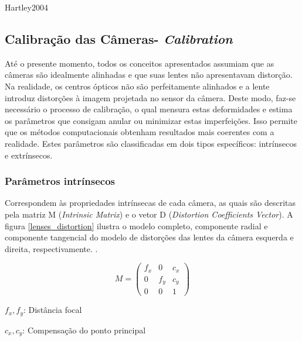 Hartley2004


\subsection{Calibração das Câmeras- \textit{Calibration}}

Até o presente momento, todos os conceitos apresentados assumiam que as câmeras são idealmente alinhadas e que suas lentes não apresentavam distorção. Na realidade, os centros ópticos não são perfeitamente alinhados e a lente introduz distorções à imagem projetada no sensor da câmera. Deste modo, faz-se necessário o processo de calibração, o qual mensura estas deformidades e estima os parâmetros que consigam anular ou minimizar estas imperfeições. Isso permite que os métodos computacionais obtenham resultados mais coerentes com a realidade.  Estes parâmetros são classificadas em dois tipos específicos: intrínsecos e extrínsecos.


\subsubsection{Parâmetros intrínsecos}

Correspondem às propriedades intrínsecas de cada câmera, as quais são descritas pela matriz M (\textit{Intrinsic Matrix}) e o vetor D (\textit{Distortion Coefficients Vector}). A figura \ref{lenses_distortion} ilustra o modelo completo, componente radial e componente tangencial do modelo de distorções das lentes da câmera esquerda e direita, respectivamente.
\cite{DevelopmentTeam2016}.

\begin{equation}
 M = \begin{pmatrix}
f_x & 0   & c_x\\ 
  0 & f_y & c_y\\ 
  0 & 0   & 1
\end{pmatrix}
\end{equation}

\begin{center}
  $f_x,f_y$: Distância focal
  
  $c_x,c_y$: Compensação do ponto principal
\end{center}

